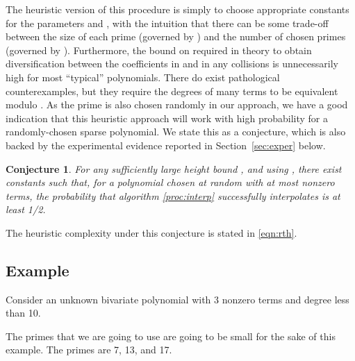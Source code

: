 \documentclass[letterpaper,10pt]{article}
\newtheorem{claim}[theorem]{Conjecture}
\begin{document}
The heuristic version of this procedure is simply to choose
appropriate constants for the parameters  and , with the
intuition that there can be some trade-off between the size of each prime
(governed by ) and the number of chosen primes (governed by ).
Furthermore, the bound on  required in theory to obtain
diversification between the coefficients in  and in any collisions is
unnecessarily high for most ``typical'' polynomials. There do exist
pathological counterexamples, but they require the degrees of many terms
to be equivalent modulo . As the prime  is also chosen randomly in
our approach, we have a good indication that this heuristic approach
will work with high probability for a randomly-chosen sparse polynomial.
We state this as a conjecture, which is also backed by the experimental
evidence reported in Section~\ref{sec:exper} below.

\begin{claim}
  For any sufficiently large height bound , and using , 
  there exist constants
   such that, for a polynomial 
  chosen at random with at most  nonzero terms, the probability that
  algorithm \ref{proc:interp} successfully interpolates  is at least
  1/2.
\end{claim}

The heuristic complexity under this conjecture is stated in \eqref{eqn:rth}.


\subsection{Example}



 Consider an unknown bivariate
 polynomial  with 3 nonzero terms and degree less
 than 10.

The primes that we are going to use are going to be small for the sake of this 
example. The primes are  7, 13, and 17.
\end{document}
